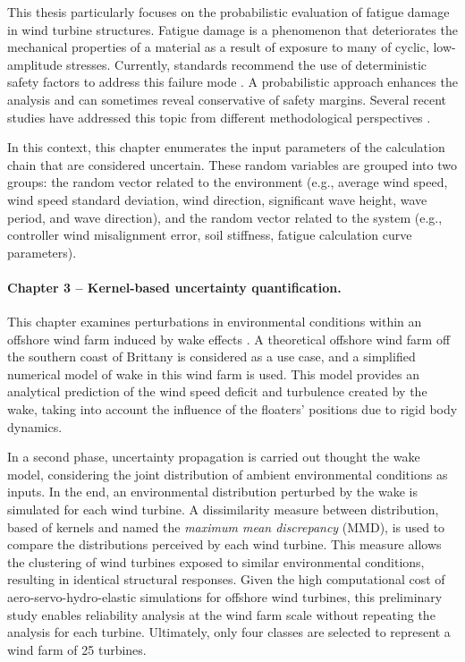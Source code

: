 This thesis particularly focuses on the probabilistic evaluation of fatigue damage in wind turbine structures. 
Fatigue damage is a phenomenon that deteriorates the mechanical properties of a material as a result of exposure to many of cyclic, low-amplitude stresses. 
Currently, standards recommend the use of deterministic safety factors to address this failure mode \citep{iec_2019,dnv_loads_2016}. 
A probabilistic approach enhances the analysis and can sometimes reveal conservative of safety margins. 
Several recent studies have addressed this topic from different methodological perspectives \citep{huchet_2019,lataniotis_2019,cousin_2021,hirvoas_2021,petrovska_2022}.

In this context, this chapter enumerates the input parameters of the calculation chain that are considered uncertain. 
These random variables are grouped into two groups: the random vector related to the environment (e.g., average wind speed, wind speed standard deviation, wind direction, significant wave height, wave period, and wave direction), 
and the random vector related to the system (e.g., controller wind misalignment error, soil stiffness, fatigue calculation curve parameters).


\paragraph{Chapter 3 -- Kernel-based uncertainty quantification.} 
This chapter examines perturbations in environmental conditions within an offshore wind farm induced by wake effects \cite{larsen_2008_wake}. 
A theoretical offshore wind farm off the southern coast of Brittany is considered as a use case, and a simplified numerical model of wake in this wind farm is used. 
This model provides an analytical prediction of the wind speed deficit and turbulence created by the wake, taking into account the influence of the floaters' positions due to rigid body dynamics. 

In a second phase, uncertainty propagation is carried out thought the wake model, considering the joint distribution of ambient environmental conditions as inputs. 
In the end, an environmental distribution perturbed by the wake is simulated for each wind turbine. 
A dissimilarity measure between distribution, based of kernels and named the \textit{maximum mean discrepancy} (MMD), is used to compare the distributions perceived by each wind turbine. 
This measure allows the clustering of wind turbines exposed to similar environmental conditions, resulting in identical structural responses. 
Given the high computational cost of aero-servo-hydro-elastic simulations for offshore wind turbines, this preliminary study enables reliability analysis at the wind farm scale without repeating the analysis for each turbine. 
Ultimately, only four classes are selected to represent a wind farm of 25 turbines.


